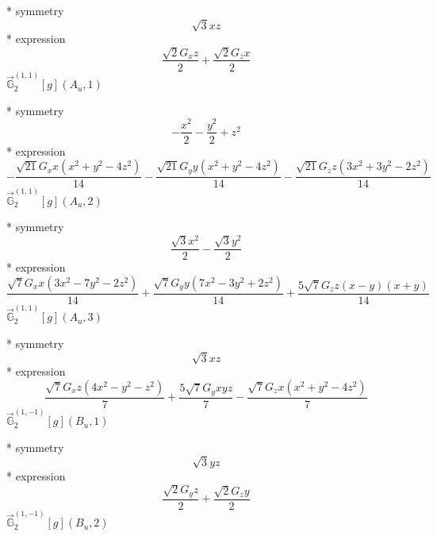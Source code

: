 \documentclass[fleqn,8pt]{jsarticle}
\begin{document}
\noindent\quad ** symmetry
\begin{dmath*}
\sqrt{3} x z
\end{dmath*}
\noindent\quad ** expression
\begin{dmath*}
\frac{\sqrt{2} G_{x} z}{2} + \frac{\sqrt{2} G_{z} x}{2}
\end{dmath*}
\noindent\quad $\vec{\mathbb{G}}_{2}^{(1,1)}[g](A_{u},1)$

\noindent\quad ** symmetry
\begin{dmath*}
- \frac{x^{2}}{2} - \frac{y^{2}}{2} + z^{2}
\end{dmath*}
\noindent\quad ** expression
\begin{dmath*}
- \frac{\sqrt{21} G_{x} x \left(x^{2} + y^{2} - 4 z^{2}\right)}{14} - \frac{\sqrt{21} G_{y} y \left(x^{2} + y^{2} - 4 z^{2}\right)}{14} - \frac{\sqrt{21} G_{z} z \left(3 x^{2} + 3 y^{2} - 2 z^{2}\right)}{14}
\end{dmath*}
\noindent\quad $\vec{\mathbb{G}}_{2}^{(1,1)}[g](A_{u},2)$

\noindent\quad ** symmetry
\begin{dmath*}
\frac{\sqrt{3} x^{2}}{2} - \frac{\sqrt{3} y^{2}}{2}
\end{dmath*}
\noindent\quad ** expression
\begin{dmath*}
\frac{\sqrt{7} G_{x} x \left(3 x^{2} - 7 y^{2} - 2 z^{2}\right)}{14} + \frac{\sqrt{7} G_{y} y \left(7 x^{2} - 3 y^{2} + 2 z^{2}\right)}{14} + \frac{5 \sqrt{7} G_{z} z \left(x - y\right) \left(x + y\right)}{14}
\end{dmath*}
\noindent\quad $\vec{\mathbb{G}}_{2}^{(1,1)}[g](A_{u},3)$

\noindent\quad ** symmetry
\begin{dmath*}
\sqrt{3} x z
\end{dmath*}
\noindent\quad ** expression
\begin{dmath*}
\frac{\sqrt{7} G_{x} z \left(4 x^{2} - y^{2} - z^{2}\right)}{7} + \frac{5 \sqrt{7} G_{y} x y z}{7} - \frac{\sqrt{7} G_{z} x \left(x^{2} + y^{2} - 4 z^{2}\right)}{7}
\end{dmath*}
\noindent\quad $\vec{\mathbb{G}}_{2}^{(1,-1)}[g](B_{u},1)$

\noindent\quad ** symmetry
\begin{dmath*}
\sqrt{3} y z
\end{dmath*}
\noindent\quad ** expression
\begin{dmath*}
\frac{\sqrt{2} G_{y} z}{2} + \frac{\sqrt{2} G_{z} y}{2}
\end{dmath*}
\noindent\quad $\vec{\mathbb{G}}_{2}^{(1,-1)}[g](B_{u},2)$
\end{document}
